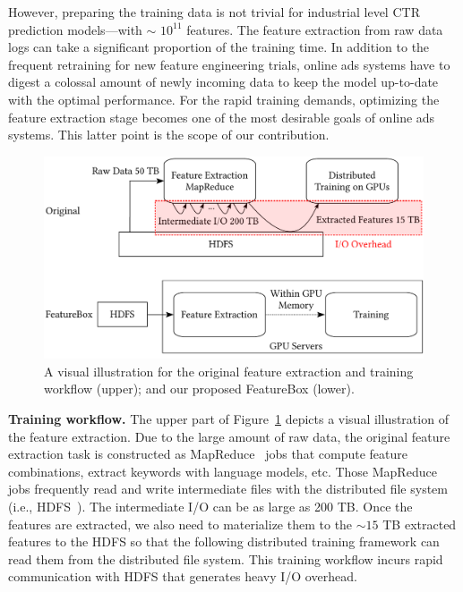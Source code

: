 \documentclass[sigconf]{acmart}
\begin{document}
However, preparing the training data is not trivial for industrial level CTR prediction models---with $\sim$ $10^{11}$ features. The feature extraction from raw data logs can take a significant proportion of the training time. In addition to the frequent retraining for new feature engineering trials, online ads systems have to digest a colossal amount of newly incoming data to keep the model up-to-date with the optimal performance. For the rapid training demands, optimizing the feature extraction stage becomes one of the most desirable goals of online ads systems.
This latter point is the scope of our contribution.




\begin{figure}[htbp]
\includegraphics[width=.5\textwidth]{figs/feabox.pdf}

\caption{A visual illustration for the original feature extraction and training workflow (upper); and our proposed FeatureBox (lower).}\label{fig:feabox}%
\end{figure}

\textbf{Training workflow.} 
The upper part of Figure~\ref{fig:feabox} depicts a visual illustration of the feature extraction. Due to the large amount of raw data, the original feature extraction task is constructed as MapReduce~\cite{dean2008mapreduce} jobs that compute feature combinations, extract keywords with language models, etc. 
Those MapReduce jobs frequently read and write intermediate files with the distributed file system (i.e., HDFS~\cite{borthakur2008hdfs}). The intermediate I/O can be as large as 200 TB. Once the features are extracted, we also need to materialize them to the $\sim$$15$ TB extracted features to the HDFS so that the following distributed training framework can read them from the distributed file system. 
This training workflow incurs rapid communication with HDFS that generates heavy I/O overhead. 
\end{document}
